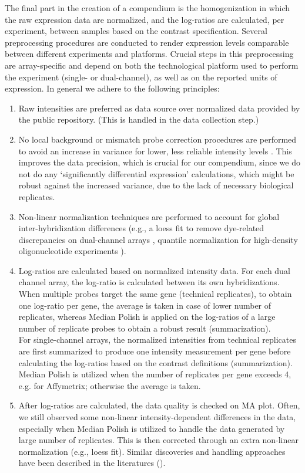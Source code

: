 The final part in the creation of a compendium is the homogenization in which the raw expression data are normalized, and the log-ratios are calculated, per experiment, between samples based on the contrast specification. Several preprocessing procedures are conducted to render expression levels comparable between different experiments and platforms. Crucial steps in this preprocessing are array-specific and depend on both the technological platform used to perform the experiment (single- or dual-channel), as well as on the reported units of expression. In general we adhere to the following principles: 
%
\begin{enumerate}
\item Raw intensities are preferred as data source over normalized data   provided by the public repository. (This is handled in the data collection   step.)
%
\item No local background or mismatch probe correction procedures are   performed to avoid an increase in variance for lower, less reliable   intensity levels \cite{Ritchie2007, Irizarry2006, Engelen2006, Li2001}.   This improves the data precision, which is crucial for our compendium, since   we do not do any `significantly differential expression' calculations, which   might be robust against the increased variance, due to the lack of necessary   biological replicates.
%
\item Non-linear normalization techniques are performed to account for global   inter-hybridization differences (e.g., a loess fit to remove dye-related   discrepancies on dual-channel arrays \cite{Yang2002}, quantile normalization   for high-density oligonucleotide experiments \cite{Bolstad2003}).
%
\item Log-ratios are calculated based on normalized intensity data.   For each dual channel array, the log-ratio is calculated between its   own hybridizations.  When multiple probes target the same gene   (technical replicates), to obtain one log-ratio per gene, the   average is taken in case of lower number of replicates, whereas   Median Polish is applied on the log-ratios of a large number of   replicate probes to obtain a robust result (summarization). \vspace{1.5mm} \\
  For single-channel arrays, the normalized intensities from technical   replicates are first summarized to produce one intensity measurement   per gene before calculating the log-ratios based on the contrast   definitions (summarization).  Median Polish is utilized when the number of   replicates per gene exceeds 4, e.g. for Affymetrix; otherwise the   average is taken.
%
\item After log-ratios are calculated, the data quality is checked on MA plot.   Often, we still observed some non-linear intensity-dependent differences in   the data, especially when Median Polish is utilized to handle the data   generated by large number of replicates.  This is then corrected through an   extra non-linear normalization (e.g., loess fit).  Similar discoveries and   handling approaches have been described in the literatures (\cite{Choe2005,     Welsh2013}).
\end{enumerate}

